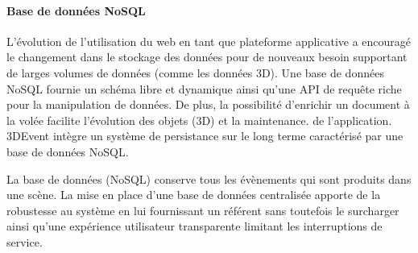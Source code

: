 \paragraph{Base de données NoSQL}\label{p:nosql} L'évolution de 
l'utilisation du web en tant que plateforme applicative a encouragé le changement 
dans le stockage des données pour de nouveaux besoin supportant de larges 
volumes de données (comme les données 3D). Une base de données \gls{NoSQL} 
fournie un schéma libre et dynamique ainsi qu'une API de requête riche pour la 
manipulation de données. De plus, la possibilité d'enrichir un document à la volée 
facilite l'évolution des objets (3D) et la maintenance. de l'application.
3DEvent intègre un système de persistance sur le long terme caractérisé par une 
base de données \gls{NoSQL}.

La base de données (\gls{NoSQL}) conserve tous les évènements qui 
sont produits dans une scène. 
La mise en place d'une base de données centralisée apporte de la robustesse au 
système en lui fournissant un référent sans toutefois le surcharger ainsi qu'une 
expérience utilisateur transparente limitant les interruptions de service.

